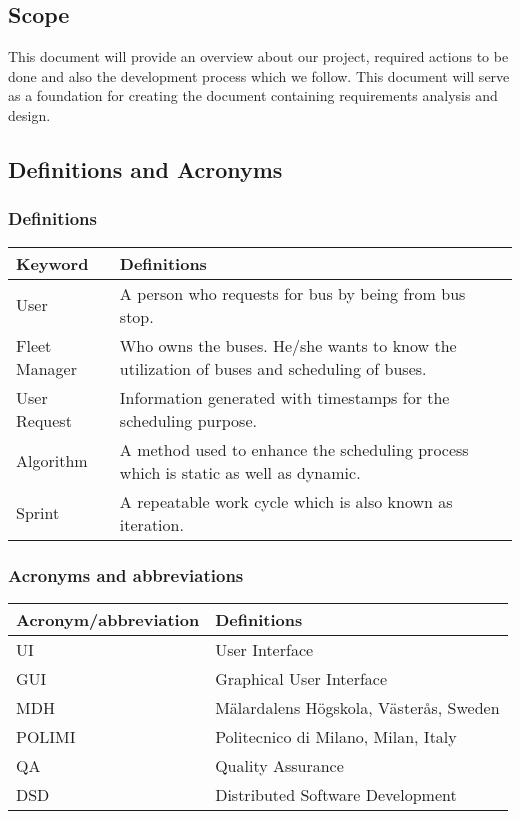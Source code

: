\subsection{Scope}
This document will provide an overview about our project, required actions to be done and also the development process which we follow.
This document will serve as a foundation for creating the document containing requirements analysis and design.
\subsection{Definitions and Acronyms}
\subsubsection{Definitions}
\begin{center}
	\begin{tabular} { | m{3cm} | m{10cm} | }
		\hline
		\textbf{Keyword} & \textbf{Definitions}\\
		\hline
		User & A person who requests for bus by being from bus stop.\\
		\hline
		Fleet Manager & Who owns the buses. He/she wants to know the utilization of buses and scheduling of buses.\\
		\hline
		User Request & Information generated with timestamps for the scheduling purpose.\\
		\hline
		Algorithm & A method used to enhance the scheduling process which is static as well as dynamic.\\
		\hline
		Sprint & A repeatable work cycle which is also known as iteration.\\
		\hline
	\end{tabular}
\end{center}
\subsubsection{Acronyms and abbreviations}
\begin{center}
	\begin{tabular} { | m{5cm} | m{8cm} | }
		\hline
		\textbf{Acronym/abbreviation} & \textbf{Definitions}\\
		\hline
		UI & User Interface\\
		\hline
		GUI & Graphical User Interface\\
		\hline
		MDH & Mälardalens Högskola, Västerås, Sweden\\
		\hline
		POLIMI & Politecnico di Milano, Milan, Italy\\
		\hline
		QA & Quality Assurance\\
		\hline
		DSD & Distributed Software Development\\
		\hline
	\end{tabular}
\end{center}